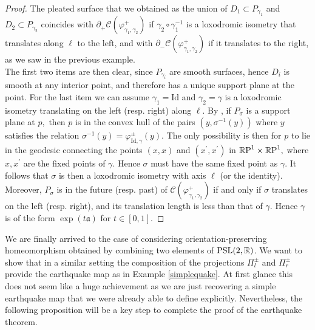  \begin{proof}
     The pleated surface that we obtained as the union of $D_1\subset P_{\gamma_1}$ and $D_2\subset P_{\gamma_2}$ coincides with $\partial_+\mathcal{C}(\varphi_{\gamma_1,\gamma_2}^+)$ if $\gamma_2\circ\gamma_1^{-1}$ is a loxodromic isometry that translates along $\ell$ to the left, and with $\partial_-\mathcal{C}(\varphi_{\gamma_1,\gamma_2}^+)$ if it translates to the right, as we saw in the previous example. \\
    The first two items are then clear, since $P_{\gamma_i}$ are smooth surfaces, hence $D_i$ is smooth at any interior point, and therefore has a unique support plane at the point. For the last item we can assume $\gamma_1=\text{Id}$ and $\gamma_2=\gamma$ is a loxodromic isometry translating on the left (resp. right) along $\ell.$ By , if $P_\sigma$ is a support plane at $p,$ then $p$ is in the convex hull of the pairs $(y,\sigma^{-1}(y))$ where $y$ satisfies the relation $\sigma^{-1}(y)=\varphi_{\text{Id},\gamma}^{\pm}(y).$ The only possibility is then for $p$ to lie in the geodesic connecting the points $(x,x)$ and $(x^{\prime},x^{\prime})$ in $\mathbb{R}\text{P}^1\times\mathbb{R}\text{P}^1,$ where $x,x^{\prime}$ are the fixed points of $\gamma$. Hence $\sigma$ must have the same fixed point as $\gamma$. It follows that $\sigma$ is then a loxodromic isometry with axis $\ell$ (or the identity). Moreover, $P_\sigma$ is in the future (resp. past) of $\mathcal{C}(\varphi_{\gamma_1,\gamma_2}^+)$ if and only if $\sigma$ translates on the left (resp. right), and its translation length is less than that of $\gamma.$ Hence $\gamma$ is of the form $\exp(t\mathfrak{a})$ for $t\in [0,1].$
\end{proof}


 We are finally arrived to the case of considering orientation-preserving homeomorphism obtained by combining two elements of $\text{PSL}(2,\mathbb{R})$. We want to show that in a similar setting the composition of the projections $\Pi_l^{\pm}$ and $\Pi_r^\pm$ provide the earthquake map as in Example \ref{simplequake}. At first glance this does not seem like a huge achievement as we are just recovering a simple earthquake map that we were already able to define explicitly. Nevertheless, the following proposition will be a key step to complete the proof of the earthquake theorem. 

